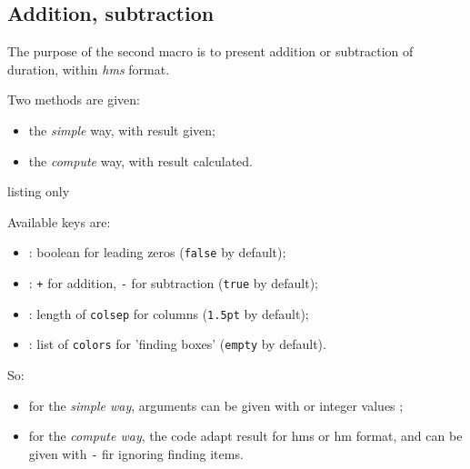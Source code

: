 \documentclass[11pt,a4paper]{ltxdoc}
\begin{document}
\subsection{Addition, subtraction}

The purpose of the second macro is to present addition or subtraction of duration, within \textit{hms} format.

Two methods are given:

\begin{itemize}
	\item the \textit{simple} way, with result given;
	\item the \textit{compute} way, with result calculated.
\end{itemize}

\begin{DemoCode}{listing only}

\end{DemoCode}

Available keys are:

\begin{itemize}[leftmargin=*]
	\item {} : boolean for leading zeros (\texttt{false} by default);
	\item {} : \texttt{+} for addition, \texttt{-} for subtraction \ShowCode{+} (\texttt{true} by default);
	\item {} : length of \texttt{colsep} for columns (\texttt{1.5pt} by default);
	\item {} : list of \texttt{colors} for 'finding boxes' (\texttt{empty} by default).
\end{itemize}

So:

\begin{itemize}
	\item for the \textit{simple way}, arguments can be given with \ShowCode{\\boxhms} or integer values ;
	\item for the \textit{compute way}, the code adapt result for hms or hm format, and  can be given with \texttt{-} fir ignoring finding items.
\end{itemize}

\begin{DemoCode}{}
\end{DemoCode}
\end{document}

